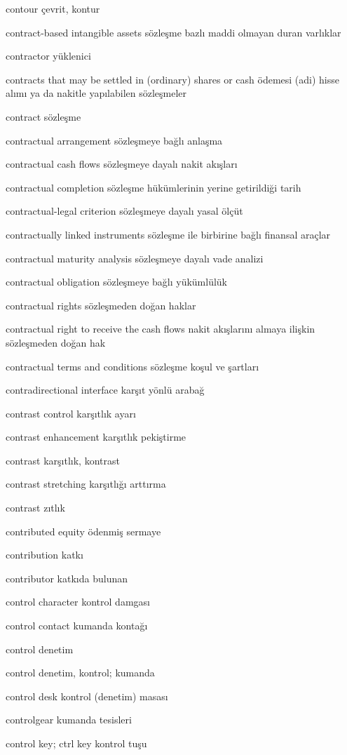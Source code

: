 \documentclass[12pt,fleqn]{article}\usepackage{../../common}
\begin{document}
contour çevrit, kontur

contract-based intangible assets sözleşme bazlı maddi olmayan duran varlıklar

contractor yüklenici

contracts that may be settled in (ordinary) shares or cash ödemesi (adi) hisse alımı ya da nakitle yapılabilen sözleşmeler

contract sözleşme

contractual arrangement sözleşmeye bağlı anlaşma

contractual cash flows sözleşmeye dayalı nakit akışları

contractual completion sözleşme hükümlerinin yerine getirildiği tarih

contractual-legal criterion sözleşmeye dayalı yasal ölçüt

contractually linked instruments sözleşme ile birbirine bağlı finansal araçlar

contractual maturity analysis sözleşmeye dayalı vade analizi

contractual obligation sözleşmeye bağlı yükümlülük

contractual rights sözleşmeden doğan haklar

contractual right to receive the cash flows nakit akışlarını almaya ilişkin sözleşmeden doğan hak

contractual terms and conditions sözleşme koşul ve şartları

contradirectional interface karşıt yönlü arabağ

contrast control karşıtlık ayarı

contrast enhancement karşıtlık pekiştirme

contrast karşıtlık, kontrast

contrast stretching karşıtlığı arttırma

contrast zıtlık

contributed equity ödenmiş sermaye

contribution katkı

contributor katkıda bulunan

control character kontrol damgası

control contact kumanda kontağı

control denetim

control denetim, kontrol; kumanda

control desk kontrol (denetim) masası

controlgear kumanda tesisleri

control key; ctrl key kontrol tuşu
\end{document}
